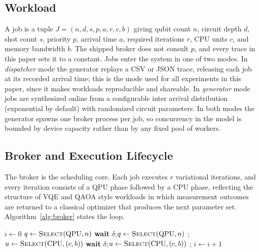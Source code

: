 \subsection{Workload}
\label{sec:arch-workload}

A job is a tuple
$J=(n, d, s, p, a, r, c, b)$
giving qubit count $n$, circuit depth $d$, shot count $s$, priority $p$, arrival time $a$, required iterations $r$, CPU units $c$, and memory bandwidth $b$. The shipped broker does not consult $p$, and every trace in this paper sets it to a constant. Jobs enter the system in one of two modes. In \emph{dispatcher} mode the generator replays a CSV or JSON trace, releasing each job at its recorded arrival time; this is the mode used for all experiments in this paper, since it makes workloads reproducible and shareable. In \emph{generator} mode jobs are synthesized online from a configurable inter arrival distribution (exponential by default) with randomized circuit parameters. In both modes the generator spawns one broker process per job, so concurrency in the model is bounded by device capacity rather than by any fixed pool of workers.

\subsection{Broker and Execution Lifecycle}
\label{sec:arch-broker}

The broker is the scheduling core. Each job executes $r$ variational iterations, and every iteration consists of a QPU phase followed by a CPU phase, reflecting the structure of VQE and QAOA style workloads in which measurement outcomes are returned to a classical optimizer that produces the next parameter set. Algorithm~\ref{alg:broker} states the loop.

\begin{algorithm}[t]
\caption{Broker process for job $J$}
\label{alg:broker}
\begin{algorithmic}[1]
\State $i \gets 0$
  \State $q \gets \Call{Select}{\mathrm{QPU}, n}$
   
    \State \textbf{wait} $\delta$;\quad $q \gets \Call{Select}{\mathrm{QPU}, n}$
  \EndWhile
  \State {};\quad {}
  \State $u \gets \Call{Select}{\mathrm{CPU}, (c,b)}$
    \State \textbf{wait} $\delta$;\quad $u \gets \Call{Select}{\mathrm{CPU}, (c,b)}$
  \EndWhile
  \State {};\quad {}
  \State $i \gets i + 1$
\EndWhile
\State {}
\end{algorithmic}
\end{algorithm}

